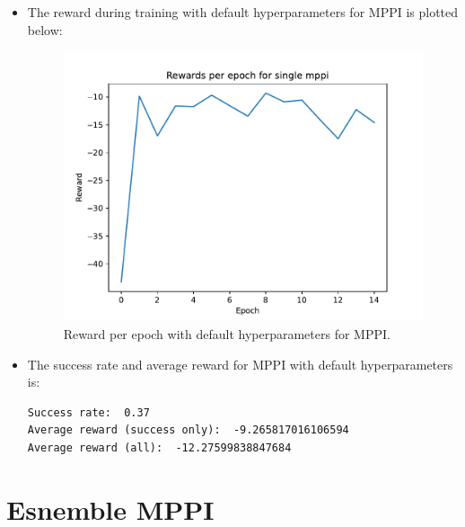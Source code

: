 \documentclass[12pt]{article}
\newcommand{\0}{\boldsymbol{0}}
\newcommand{\1}{\boldsymbol{1}}
\begin{document}
\begin{itemize}
    \item The reward during training with default hyperparameters for MPPI is plotted below:

    \begin{figure}[H]
        \centering
        \includegraphics[width=.7\linewidth]{../figs/single_mppi.pdf}
        \caption{Reward per epoch with default hyperparameters for MPPI.}
        \label{fig:fig1}
    \end{figure}

    \item The success rate and average reward for MPPI with default hyperparameters is:
    \begin{verbatim}
Success rate:  0.37
Average reward (success only):  -9.265817016106594
Average reward (all):  -12.27599838847684
    \end{verbatim}
\end{itemize}

\newpage

\section{Esnemble MPPI}
\end{document}

